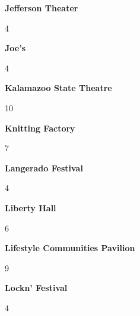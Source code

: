 \begin{center}\textbf{Jefferson Theater}\end{center}
\begin{center}4\end{center} 
\newline 
\begin{center}\textbf{Joe's}\end{center}
\begin{center}4\end{center} 
\newline 
\begin{center}\textbf{Kalamazoo State Theatre}\end{center}
\begin{center}10\end{center} 
\newline 
\begin{center}\textbf{Knitting Factory}\end{center}
\begin{center}7\end{center} 
\newline 
\begin{center}\textbf{Langerado Festival}\end{center}
\begin{center}4\end{center} 
\newline 
\begin{center}\textbf{Liberty Hall}\end{center}
\begin{center}6\end{center} 
\newline 
\begin{center}\textbf{Lifestyle Communities Pavilion}\end{center}
\begin{center}9\end{center} 
\newline 
\begin{center}\textbf{Lockn' Festival}\end{center}
\begin{center}4\end{center} 
